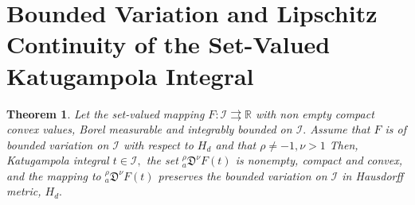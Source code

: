 \documentclass{amsproc}
\newtheorem{theorem}{Theorem}[section]
\theoremstyle{definition}
\theoremstyle{remark}
\numberwithin{equation}{section}
\begin{document}
\section{Bounded Variation and Lipschitz Continuity of the  Set-Valued Katugampola Integral} \label{sec4}
 \begin{theorem} \label{BoundVar}
     Let the set-valued mapping $F:\mathcal{I} \rightrightarrows \mathbb{R} $ with non empty compact convex values, Borel measurable and integrably bounded on $\mathcal{I}.$ Assume that $F$ is of bounded variation on $\mathcal{I}$ with respect to $H_d$ and that $\rho \neq -1, \nu >1$ Then, Katugampola integral $t\in \mathcal{I},$ the set $_a^\rho\mathfrak{D}^\nu F(t)$ is nonempty, compact and convex, and the mapping  to $_a^\rho\mathfrak{D}^\nu F(t)$ preserves the bounded variation on $\mathcal{I}$ in Hausdorff metric, $H_d.$
 \end{theorem}
\end{document}
